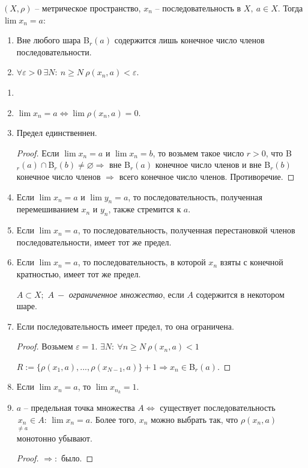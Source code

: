 \begin{definition}
    $(X,\rho)$ – метрическое пространство, $x_n$ – последовательность в $X,\ a\in X$. Тогда $\lim x_n = a$:
    \begin{enumerate}
        \item Вне любого шара B$_r(a)$ содержится лишь конечное число членов последовательности.
        \item $\forall \varepsilon > 0\ \exists N:\ n\geq N\ \rho(x_n, a)<\varepsilon$.
    \end{enumerate}
\end{definition}

\begin{proper}
    \begin{enumerate}
        \item[]
        \item $\lim x_n=a\Leftrightarrow \lim \rho(x_n,a)=0$.
        \item Предел единственнен.
        \begin{proof}
            Если $\lim x_n=a$ и $\lim x_n=b$, то возьмем такое число $r>0$, что B$_r(a)\cap$B$_r(b)\neq \varnothing\Rightarrow$ вне B$_r(a)$ конечное число членов и вне B$_r(b)$ конечное число членов $\Rightarrow$ всего конечное число членов. Противоречие.
        \end{proof}
        \item Если $\lim x_n=a$ и $\lim y_n=a$, то последовательность, полученная перемешиванием $x_n$ и $y_n$, также стремится к $a$.
        \item Если $\lim x_n=a$, то последовательность, полученная перестановкой членов последовательности, имеет тот же предел.
        \item Если $\lim x_n=a$, то последовательность, в которой $x_n$ взяты с конечной кратностью, имеет тот же предел.

        \begin{definition}
            $A\subset X;$ $A\ -$ \textit{ограниченное множество}, если $A$ содержится в некотором шаре.
        \end{definition}

        \item Если последовательность имеет предел, то она ограничена.
        \begin{proof}
            Возьмем $\varepsilon=1$. $\exists N:\ \forall n\geq N \ \rho(x_n, a)<1$

            $R:=\{\rho(x_1,a),...,\rho(x_{N-1}, a)\}+1\Rightarrow x_n\in$B$_r(a)$.
        \end{proof}
        \item Если $\lim x_n=a$, то $\lim x_{n_k}=1$.
        \item $a$ – предельная точка множества $A\Leftrightarrow$ существует последовательность $\underset{\neq a}{x_n}\in A$: $\lim x_n=a$. Более того, $x_n$ можно выбрать так, что $\rho(x_n,a)$ монотонно убывают.
        \begin{proof}
            $\Rightarrow:$ было.


\end{proof}
\end{enumerate}
\end{proper}

